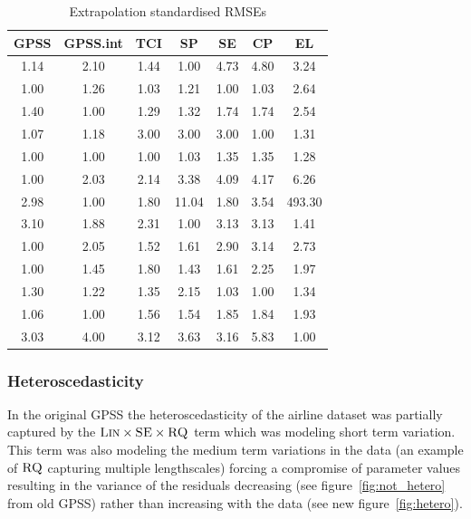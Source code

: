 \documentclass{article}
\begin{document}
\begin{table}
\begin{tabular}{|c|c|c|c|c|c|c|}
\hline
GPSS & GPSS.int & TCI & SP & SE & CP & EL \\
\hline
1.14 & 2.10 & 1.44 & 1.00 & 4.73 & 4.80 & 3.24\\
1.00 & 1.26 & 1.03 & 1.21 & 1.00 & 1.03 & 2.64\\
1.40 & 1.00 & 1.29 & 1.32 & 1.74 & 1.74 & 2.54\\
1.07 & 1.18 & 3.00 & 3.00 & 3.00 & 1.00 & 1.31\\
1.00 & 1.00 & 1.00 & 1.03 & 1.35 & 1.35 & 1.28\\
1.00 & 2.03 & 2.14 & 3.38 & 4.09 & 4.17 & 6.26\\
2.98 & 1.00 & 1.80 & 11.04 & 1.80 & 3.54 & 493.30\\
3.10 & 1.88 & 2.31 & 1.00 & 3.13 & 3.13 & 1.41\\
1.00 & 2.05 & 1.52 & 1.61 & 2.90 & 3.14 & 2.73\\
1.00 & 1.45 & 1.80 & 1.43 & 1.61 & 2.25 & 1.97\\
1.30 & 1.22 & 1.35 & 2.15 & 1.03 & 1.00 & 1.34\\
1.06 & 1.00 & 1.56 & 1.54 & 1.85 & 1.84 & 1.93\\
3.03 & 4.00 & 3.12 & 3.63 & 3.16 & 5.83 & 1.00\\
\hline
\end{tabular}
\caption{Extrapolation standardised RMSEs}
\end{table}





\subsubsection{Heteroscedasticity}

In the original GPSS the heteroscedasticity of the airline dataset was partially captured by the ${\textsc{Lin}} \times {\textsc{SE}} \times {\textsc{RQ}}$ term which was modeling short term variation.
This term was also modeling the medium term variations in the data (an example of ${\textsc{RQ}}$ capturing multiple lengthscales) forcing a compromise of parameter values resulting in the variance of the residuals decreasing (see figure~\ref{fig:not_hetero} from old GPSS) rather than increasing with the data (see new figure~\ref{fig:hetero}).
\end{document}
